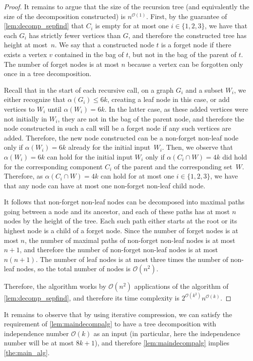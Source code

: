 \documentclass[11pt]{article}
\theoremstyle{definition}
\newcommand{\OO}{\mathcal{O}}
\begin{document}
\begin{proof}
It remains to argue that the size of the recursion tree (and equivalently the size of the decomposition constructed) is $n^{\OO(1)}$.
First, by the guarantee of \cref{lem:decomp_sepfind} that $C_i$ is empty for at most one $i \in \{1,2,3\}$, we have that each $G_i$ has strictly fewer vertices than $G$, and therefore the constructed tree has height at most~$n$.
We say that a constructed node $t$ is a forget node if there exists a vertex $v$ contained in the bag of $t$, but not in the bag of the parent of $t$.
The number of forget nodes is at most $n$ because a vertex can be forgotten only once in a tree decomposition.

Recall that in the start of each recursive call, on a graph $G_i$ and a subset $W_i$, we either recognize that $\alpha(G_i) \le 6k$, creating a leaf node in this case, or add vertices to $W_i$ until $\alpha(W_i) = 6k$.
In the latter case, as these added vertices were not initially in $W_i$, they are not in the bag of the parent node, and therefore the node constructed in such a call will be a forget node if any such vertices are added.
Therefore, the new node constructed can be a non-forget non-leaf node only if $\alpha(W_i) = 6k$ already for the initial input~$W_i$.
Then, we observe that $\alpha(W_i) = 6k$ can hold for the initial input $W_i$ only if $\alpha(C_i \cap W) = 4k$ did hold for the corresponding component $C_i$ of the parent and the corresponding set~$W$.
Therefore, as $\alpha(C_i \cap W) = 4k$ can hold for at most one $i \in \{1,2,3\}$, we have that any node can have at most one non-forget non-leaf child node.

It follows that non-forget non-leaf nodes can be decomposed into maximal paths going between a node and its ancestor, and each of these paths has at most $n$ nodes by the height of the tree.
Each such path either starts at the root or its highest node is a child of a forget node.
Since the number of forget nodes is at most $n$, the number of maximal paths of non-forget non-leaf nodes is at most $n+1$, and therefore the number of non-forget non-leaf nodes is at most~$n(n+1)$.
The number of leaf nodes is at most three times the number of non-leaf nodes, so the total number of nodes is $\OO(n^2)$.

Therefore, the algorithm works by $\OO(n^2)$ applications of the algorithm of \cref{lem:decomp_sepfind}, and therefore its time complexity is $2^{\OO(k^2)} n^{\OO(k)}$.
\end{proof}


It remains to observe that by using iterative compression, we can satisfy the requirement of \cref{lem:maindecompalg} to have a tree decomposition with independence number $\OO(k)$ as an input (in particular, here the independence number will be at most $8k+1$), and therefore \cref{lem:maindecompalg} implies \cref{the:main_alg}.
\end{document}
